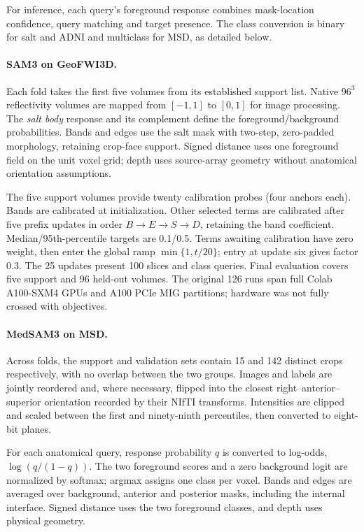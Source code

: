 \documentclass[12pt,a4paper]{article}
\begin{document}
For inference, each query's foreground response combines mask-location
confidence, query matching and target presence. The class conversion
is binary for salt and ADNI and multiclass for MSD, as detailed below.

\paragraph{SAM3 on GeoFWI3D.}\label{sec:sam3-methods-details}
Each fold takes the first five volumes from its established support
list. Native $96^3$ reflectivity volumes are mapped from $[-1,1]$ to
$[0,1]$ for image processing. The \emph{salt body} response and its
complement define the foreground/background probabilities. Bands and
edges use the salt mask with two-step, zero-padded morphology, retaining
crop-face support. Signed distance uses one foreground field on the
unit voxel grid; depth uses source-array geometry without anatomical
orientation assumptions.

The five support volumes provide twenty calibration probes (four
anchors each). Bands are calibrated at initialization. Other selected
terms are calibrated after five prefix updates in order $B\to E\to S\to D$,
retaining the band coefficient. Median/95th-percentile targets are
0.1/0.5. Terms awaiting calibration have zero weight, then enter the
global ramp $\min\{1,t/20\}$; entry at update six gives factor 0.3.
The 25 updates present 100 slices and class queries. Final evaluation
covers five support and 96 held-out volumes. The original 126 runs
span full Colab A100-SXM4 GPUs and A100 PCIe MIG partitions;
hardware was not fully crossed with objectives.

\paragraph{MedSAM3 on MSD.}\label{sec:medsam-methods-details}
Across folds, the support and validation sets contain 15 and 142
distinct crops respectively, with no overlap between the two groups.
Images and labels are jointly reordered and, where necessary, flipped
into the closest right--anterior--superior orientation recorded by
their NIfTI transforms. Intensities are clipped and scaled between
the first and ninety-ninth percentiles, then converted to eight-bit
planes.

For each anatomical query, response probability $q$ is converted to
log-odds, $\log(q/(1-q))$. The two foreground scores and a zero
background logit are normalized by softmax; argmax assigns one class
per voxel. Bands and edges are averaged over background, anterior and
posterior masks, including the internal interface. Signed distance
uses the two foreground classes, and depth uses physical geometry.
\end{document}
